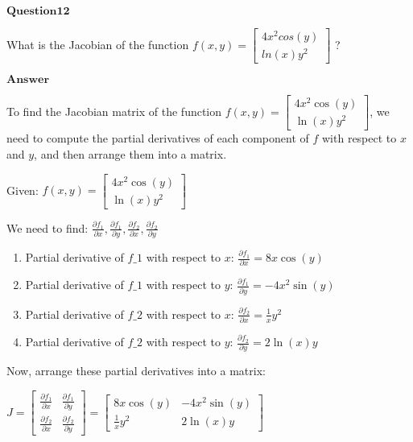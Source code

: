 \documentclass[11pt]{article}
\begin{document}
    $\textbf{Question12}$

What is the Jacobian of the function
$f(x,y)=\begin{bmatrix} 4x^2 cos(y) \\ ln(x)y^2 \end{bmatrix}$ ?

$\textbf{Answer}$

To find the Jacobian matrix of the function $ f(x, y) = \begin{bmatrix} 4x^2 \cos(y) \\ \ln(x)y^2 \end{bmatrix}$, 
we need to compute the partial derivatives of each component of $ f $ with respect to $ x $ and $ y $, and then arrange them into a matrix.

Given: $ f(x, y) = \begin{bmatrix} 4x^2 \cos(y) \\ \ln(x)y^2 \end{bmatrix} $

We need to find: $ \frac{\partial f_1}{\partial x},
\frac{\partial f_1}{\partial y}, \frac{\partial f_2}{\partial x},
\frac{\partial f_2}{\partial y} $

\begin{enumerate}
\def\labelenumi{\arabic{enumi}.}
\item
  Partial derivative of $ f\_1 $ with respect to $ x $: $
  \frac{\partial f_1}{\partial x} = 8x \cos(y) $
\item
  Partial derivative of $ f\_1 $ with respect to $ y $: $
  \frac{\partial f_1}{\partial y} = -4x^2 \sin(y) $
\item
  Partial derivative of $ f\_2 $ with respect to $ x $: $
  \frac{\partial f_2}{\partial x} = \frac{1}{x}y^2 $
\item
  Partial derivative of $ f\_2 $ with respect to $ y $: $
  \frac{\partial f_2}{\partial y} = 2\ln(x)y $
\end{enumerate}

Now, arrange these partial derivatives into a matrix:

$ J =\begin{bmatrix} \frac{\partial f_1}{\partial x} & \frac{\partial f_1}{\partial y} \\ \frac{\partial f_2}{\partial x} & \frac{\partial f_2}{\partial y} \end{bmatrix}=\begin{bmatrix} 8x\cos(y) & -4x^2 \sin(y) \\ \frac{1}{x}y^2 & 2\ln(x)y \end{bmatrix}$
\end{document}
